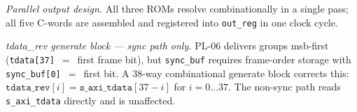 \begin{table}[htbp]
  \caption{PL-07 C-word output bit-field mapping (non-sync
           path)~\cite{ITU_J83}.
           \texttt{c4[n]}~$=$~\texttt{ttx\_data[n]};
           \texttt{c0[n]}~$=$~\texttt{tty\_data[n]};
           \texttt{td}~$=$~\texttt{s\_axi\_tdata}.
           Packing: \texttt{m\_axi\_tdata}~$=$
           \texttt{\{sym[4][7:0], \ldots, sym[0][7:0]\}}.}
  \label{tab:pl07_output_map}
  \begin{center}
  \end{center}
\end{table}
\FloatBarrier

\textit{Parallel output design.}
All three ROMs resolve combinationally in a single pass; all five
C-words are assembled and registered into \texttt{out\_reg} in one
clock cycle.

\textit{tdata\_rev generate block — sync path only.}
PL-06 delivers groups \ac{msb}-first (\texttt{tdata[37]}~$=$~first
frame bit), but \texttt{sync\_buf} requires frame-order storage with
\texttt{sync\_buf[0]}~$=$~first bit.
A 38-way combinational generate block corrects this:
$\texttt{tdata\_rev}[i] = \texttt{s\_axi\_tdata}[37-i]$
for $i = 0 \ldots 37$.
The non-sync path reads \texttt{s\_axi\_tdata} directly and is
unaffected.

